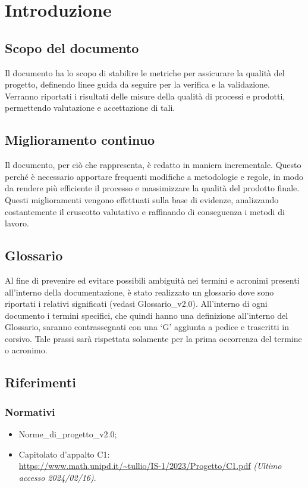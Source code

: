 \chapter{Introduzione}\label{chap:intro}

\section{Scopo del documento}
Il documento ha lo scopo di stabilire le metriche per assicurare la qualità del progetto, definendo linee guida da seguire per la verifica e la validazione. Verranno riportati i risultati delle misure della qualità di processi e prodotti, permettendo valutazione e accettazione di tali.

\section{Miglioramento continuo}
Il documento, per ciò che rappresenta, è redatto in maniera incrementale. Questo perché è necessario apportare frequenti modifiche a metodologie e regole, in modo da rendere più efficiente il processo e massimizzare la qualità del prodotto finale. Questi miglioramenti vengono effettuati sulla base di evidenze, analizzando costantemente il cruscotto valutativo e raffinando di conseguenza i metodi di lavoro.

\section{Glossario}
Al fine di prevenire ed evitare possibili ambiguità nei termini e acronimi presenti all’interno della documentazione, è stato realizzato un glossario dove sono riportati i relativi significati (vedasi Glossario\_v2.0). All’interno di ogni documento i termini specifici, che quindi hanno una definizione all’interno del Glossario, saranno contrassegnati con una ‘G’ aggiunta a pedice e trascritti in corsivo. Tale prassi sarà rispettata solamente per la prima occorrenza del termine o acronimo.

\section{Riferimenti}
\subsection{Normativi}
\begin{itemize}
    \item Norme\_di\_progetto\_v2.0;
    \item Capitolato d'appalto C1: \\ \url{https://www.math.unipd.it/~tullio/IS-1/2023/Progetto/C1.pdf} \textit{(Ultimo accesso 2024/02/16)}.
\end{itemize}

